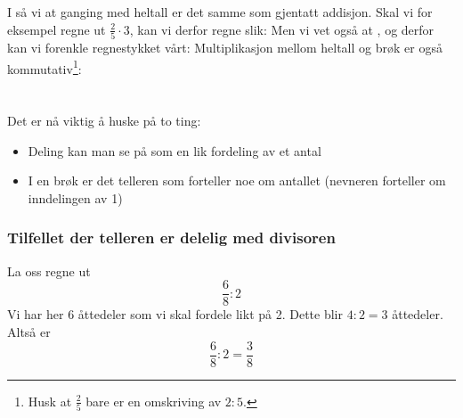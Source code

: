 \section{\brgngheil}
I  så vi at ganging med heltall er det samme som gjentatt addisjon. Skal vi for eksempel regne ut $ \frac{2}{5}\cdot 3 $, kan vi derfor regne slik:
Men vi vet også at , og derfor kan vi forenkle regnestykket vårt:
Multiplikasjon mellom heltall og brøk er også kommutativ\footnote{Husk at $ \frac{2}{5} $ bare er en omskriving av $ 2:5 $. }:

\newpage
{}

\newpage
\section{\brdelheil}
Det er nå viktig å huske på to ting:
\begin{itemize}
	\item Deling kan man se på som en lik fordeling av et antal
	\item I en brøk er det telleren som forteller noe om antallet (nevneren forteller om inndelingen av 1)
\end{itemize}
\subsubsection{Tilfellet der telleren er delelig med divisoren}
La oss regne ut
\[ \frac{6}{8}:2 \]
Vi har her 6 åttedeler som vi skal fordele likt på 2. Dette blir $ 4:2=3 $ åttedeler.
Altså er
\[ \frac{6}{8}:2=\frac{3}{8} \]
\newpage
